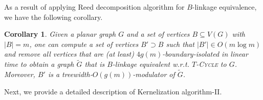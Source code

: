 \documentclass{article}
\newtheorem{corollary}[theorem]{Corollary}
\numberwithin{claimcounter}{lemma}
\newcommand{\tcycle}{$T$-\textsc{Cycle}\xspace}
\begin{document}
As a result of applying {\sc Reed decomposition algorithm for $B$-linkage equivalence}, we have the following corollary.

\begin{corollary} \label{C:twrednsubprot}
    Given a planar graph $G$ and a set of
    vertices $B\subseteq V(G)$ with $|B|=m $, one can compute a set of  vertices $B' \supset B$ such that $|B'| \in O(m \log m)$ and remove all vertices that are (at least) $4 g(m)$-boundary-isolated  in linear time to obtain a graph $\tilde{G}$ that is $B$-linkage equivalent w.r.t. \tcycle to $G$. Moreover, $B'$ is a treewidth-$O(g(m))$-modulator of $\tilde{G}$. 
\end{corollary}


Next, we provide a detailed description of {\sc Kernelization algorithm-II}.
\end{document}
